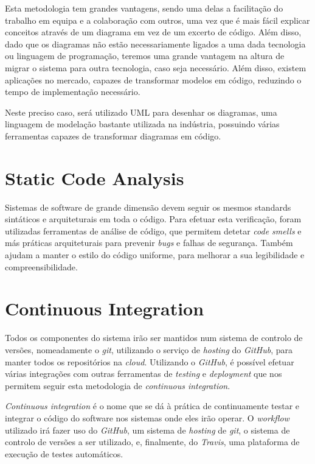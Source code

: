 Esta metodologia tem grandes vantagens, sendo uma delas a facilitação do trabalho em equipa e a colaboração com outros, uma vez que é mais fácil explicar conceitos através de um diagrama em vez de um excerto de código. Além disso, dado que os diagramas não estão necessariamente ligados a uma dada tecnologia ou linguagem de programação, teremos uma grande vantagem na altura de migrar o sistema para outra tecnologia, caso seja necessário. Além disso, existem aplicações no mercado, capazes de transformar modelos em código, reduzindo o tempo de implementação necessário.

Neste preciso caso, será utilizado UML para desenhar os diagramas, uma linguagem de modelação bastante utilizada na indústria, possuindo várias ferramentas capazes de transformar diagramas em código.

\section{Static Code Analysis}

Sistemas de software de  grande dimensão devem seguir os mesmos standards sintáticos e arquiteturais em toda o código. Para efetuar esta verificação, foram utilizadas ferramentas de análise de código, que permitem detetar \textit{code smells} e más práticas arquiteturais para prevenir \textit{bugs} e falhas de segurança. Também ajudam a manter o estilo do código uniforme, para melhorar a sua legibilidade e compreensibilidade.

\section{Continuous Integration}

Todos os componentes do sistema irão ser mantidos num sistema de controlo de versões, nomeadamente o \textit{git}, utilizando o serviço de \textit{hosting} do \textit{GitHub}, para manter todos os repositórios na \textit{cloud}. Utilizando o \textit{GitHub}, é possível efetuar várias integrações com outras ferramentas de \textit{testing} e \textit{deployment} que nos permitem seguir esta metodologia de \textit{continuous integration}.

\textit{Continuous integration} é o nome que se dá à prática de continuamente testar e integrar o código do software nos sistemas onde eles irão operar. O \textit{workflow} utilizado irá fazer uso do \textit{GitHub}, um sistema de \textit{hosting} de \textit{git}, o sistema de controlo de versões a ser utilizado, e, finalmente, do \textit{Travis}, uma plataforma de execução de testes automáticos.

